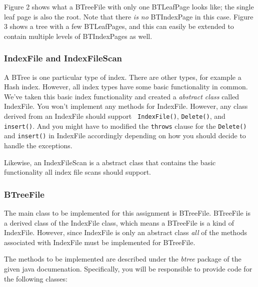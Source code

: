 Figure 2 shows what a BTreeFile with only one
BTLeafPage looks like; the single leaf page is also the root.  
Note that there {\em is no} BTIndexPage in this
case.  Figure 3 shows a tree with a few
BTLeafPages, and this can easily be extended to contain multiple
levels of BTIndexPages as well.  

\subsubsection{IndexFile and IndexFileScan}

A BTree is one particular type of index.  There are other types, for example
a Hash index.  However, all index types have some
basic functionality in common.  We've taken this basic index functionality
and created a {\em abstract class} called IndexFile.  You won't implement
any methods for IndexFile.  However, any class derived from an IndexFile 
should support {\tt ~IndexFile()}, {\tt Delete()}, and {\tt
insert()}.  And you might have to modified the \verb+throws+ 
clause for the {\tt Delete()} and {\tt insert()} in IndexFile accordingly
depending on how you should decide to handle the exceptions.

Likewise, an IndexFileScan is a abstract class
that contains the basic functionality all index file scans should support.

\subsubsection{BTreeFile}

The main class to be implemented for this assignment is BTreeFile.  
BTreeFile is a derived class of the IndexFile class, which means 
a BTreeFile is a
kind of IndexFile.  However, since IndexFile is only an abstract class
{\em all} of the methods associated with IndexFile must be implemented
for BTreeFile.  

The methods to be implemented are described under the {\em btree}
package of the given java documenation.  Specifically, you will be
responsible to provide code for the following classes:

